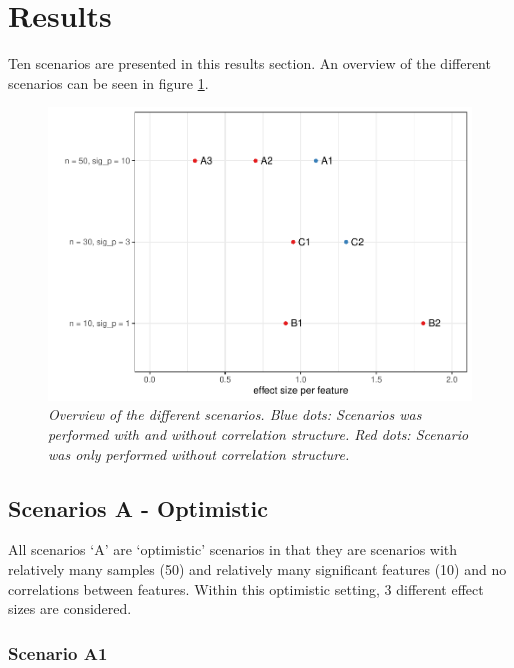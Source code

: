 \documentclass[
]{article}
\begin{document}
\newpage

\hypertarget{results}{%
\section{Results}\label{results}}

Ten scenarios are presented in this results section. An overview of the different scenarios can be seen in figure \ref{fig:overviewscenarios}.

\begin{figure}

{\centering \includegraphics[width=0.75\linewidth]{main_files/figure-latex/overviewscenarios-1} 

}

\caption{\textit{Overview of the different scenarios. Blue dots: Scenarios was performed with and without correlation structure. Red dots: Scenario was only performed without correlation structure.}}\label{fig:overviewscenarios}
\end{figure}

\hypertarget{scenarios-a---optimistic}{%
\subsection{Scenarios A - Optimistic}\label{scenarios-a---optimistic}}

All scenarios `A' are `optimistic' scenarios in that they are scenarios with relatively many samples (50) and relatively many significant features (10) and no correlations between features. Within this optimistic setting, 3 different effect sizes are considered.

\hypertarget{scenario-a1}{%
\subsubsection{Scenario A1}\label{scenario-a1}}
\end{document}
